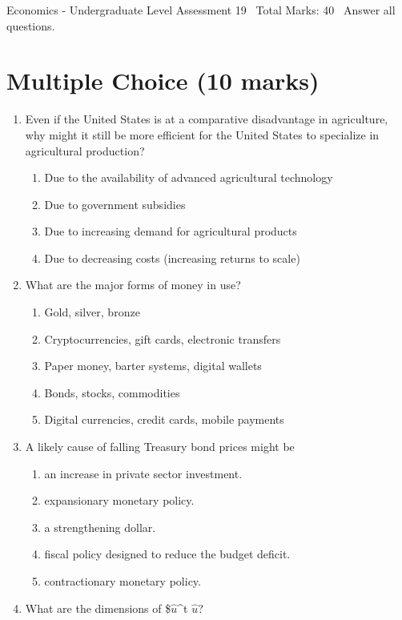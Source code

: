 \documentclass[12pt]{article}
\begin{document}
\begin{center}
Economics - Undergraduate Level Assessment 19 \
Total Marks: 40 \
Answer all questions.
\end{center}

\section*{Multiple Choice (10 marks)}
\begin{enumerate}[label=\arabic*.]
\item Even if the United States is at a comparative disadvantage in agriculture, why might it still be more efficient for the United States to specialize in agricultural production?
\begin{enumerate}[label=(\alph*)]
    \item Due to the availability of advanced agricultural technology
    \item Due to government subsidies
    \item Due to increasing demand for agricultural products
    \item Due to decreasing costs (increasing returns to scale)
\end{enumerate}
\item What are the major forms of money in use?
\begin{enumerate}[label=(\alph*)]
    \item Gold, silver, bronze
    \item Cryptocurrencies, gift cards, electronic transfers
    \item Paper money, barter systems, digital wallets
    \item Bonds, stocks, commodities
    \item Digital currencies, credit cards, mobile payments
\end{enumerate}
\item A likely cause of falling Treasury bond prices might be
\begin{enumerate}[label=(\alph*)]
    \item an increase in private sector investment.
    \item expansionary monetary policy.
    \item a strengthening dollar.
    \item fiscal policy designed to reduce the budget deficit.
    \item contractionary monetary policy.
\end{enumerate}
\item What are the dimensions of \$\ensuremath{\hat{u}}^t \ensuremath{\hat{u}}?

\end{enumerate}
\end{document}
